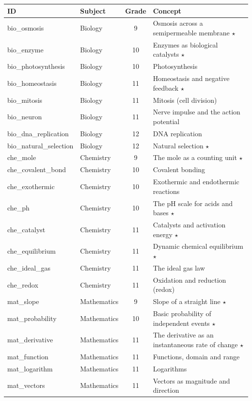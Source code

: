 \begin{center}\small
\begin{tabular}{llcl}
\toprule
ID & Subject & Grade & Concept \\ \midrule
bio\_osmosis & Biology & 9 & Osmosis across a semipermeable membrane $\star$ \\
bio\_enzyme & Biology & 10 & Enzymes as biological catalysts $\star$ \\
bio\_photosynthesis & Biology & 10 & Photosynthesis  \\
bio\_homeostasis & Biology & 11 & Homeostasis and negative feedback $\star$ \\
bio\_mitosis & Biology & 11 & Mitosis (cell division)  \\
bio\_neuron & Biology & 11 & Nerve impulse and the action potential  \\
bio\_dna\_replication & Biology & 12 & DNA replication  \\
bio\_natural\_selection & Biology & 12 & Natural selection $\star$ \\
che\_mole & Chemistry & 9 & The mole as a counting unit $\star$ \\
che\_covalent\_bond & Chemistry & 10 & Covalent bonding  \\
che\_exothermic & Chemistry & 10 & Exothermic and endothermic reactions  \\
che\_ph & Chemistry & 10 & The pH scale for acids and bases $\star$ \\
che\_catalyst & Chemistry & 11 & Catalysts and activation energy $\star$ \\
che\_equilibrium & Chemistry & 11 & Dynamic chemical equilibrium $\star$ \\
che\_ideal\_gas & Chemistry & 11 & The ideal gas law  \\
che\_redox & Chemistry & 11 & Oxidation and reduction (redox)  \\
mat\_slope & Mathematics & 9 & Slope of a straight line $\star$ \\
mat\_probability & Mathematics & 10 & Basic probability of independent events $\star$ \\
mat\_derivative & Mathematics & 11 & The derivative as an instantaneous rate of change $\star$ \\
mat\_function & Mathematics & 11 & Functions, domain and range  \\
mat\_logarithm & Mathematics & 11 & Logarithms  \\
mat\_vectors & Mathematics & 11 & Vectors as magnitude and direction  \\

\end{tabular}
\end{center}
